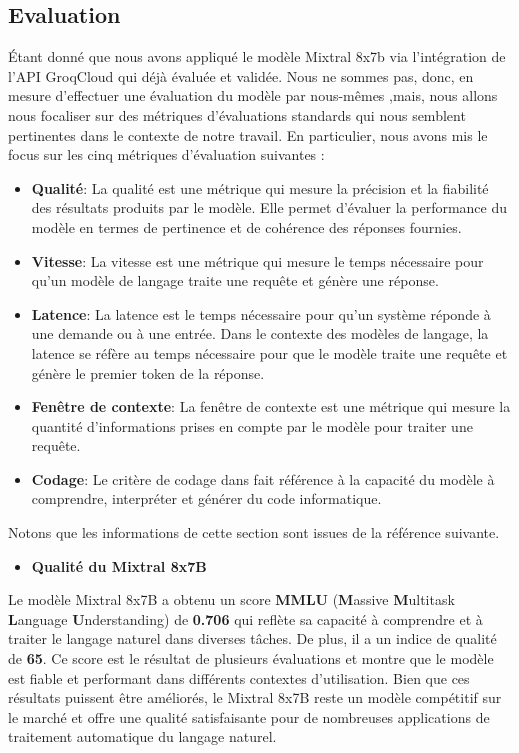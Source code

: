 \subsection{Evaluation}
Étant donné que nous avons appliqué  le modèle Mixtral 8x7b via l'intégration de l’API GroqCloud qui déjà évaluée et validée.  Nous ne sommes pas, donc, en mesure d'effectuer une évaluation du modèle par nous-mêmes ,mais, nous allons nous focaliser sur des métriques d'évaluations standards qui nous semblent pertinentes dans le contexte de notre travail. En particulier, nous avons mis le focus sur les cinq métriques d'évaluation suivantes :
\begin{itemize}
    \item \textbf{Qualité}: La qualité est une métrique qui mesure la précision et la fiabilité des résultats produits par le modèle. Elle permet d'évaluer la performance du modèle en termes de pertinence et de cohérence des réponses fournies.
    \item \textbf{Vitesse}: La vitesse est une métrique qui mesure le temps nécessaire pour qu'un modèle de langage traite une requête et génère une réponse.
    \item \textbf{Latence}: La latence est le temps nécessaire pour qu'un système réponde à une demande ou à une entrée. Dans le contexte des modèles de langage, la latence se réfère au temps nécessaire pour que le modèle traite une requête et génère le premier token de la réponse.
    \item \textbf{Fenêtre de contexte}: La fenêtre de contexte est une métrique qui mesure la quantité d'informations prises en compte par le modèle pour traiter une requête.
    \item \textbf{Codage}: Le critère de codage dans fait référence à la capacité du modèle à comprendre, interpréter et générer du code informatique.
\end{itemize}
Notons que les informations de cette section sont issues de la référence suivante. \cite{mixtral8x7b}

\begin{itemize}
    \item \textbf{Qualité du Mixtral 8x7B }
\end{itemize}
\noindent Le modèle Mixtral 8x7B a obtenu un score \textbf{MMLU} (\textbf{M}assive \textbf{M}ultitask \textbf{L}anguage \textbf{U}nderstanding) de \textbf{0.706} qui reflète sa capacité à comprendre et à traiter le langage naturel dans diverses tâches. De plus, il a un indice de qualité de \textbf{65}. Ce score est le résultat de plusieurs évaluations et montre que le modèle est fiable et performant dans différents contextes d'utilisation. Bien que ces résultats puissent être améliorés, le Mixtral 8x7B reste un modèle compétitif sur le marché et offre une qualité satisfaisante pour de nombreuses applications de traitement automatique du langage naturel.

